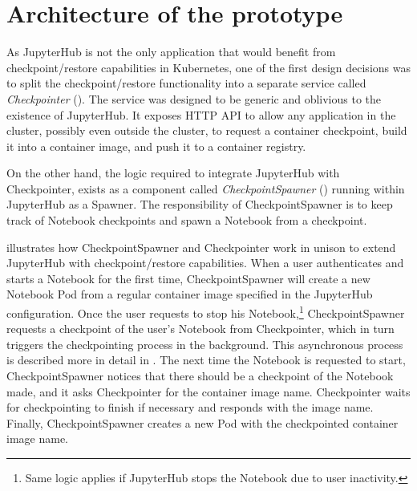 \documentclass[
  digital,     %
  oneside,     %
  nosansbold,  %
  nocolorbold, %
  lof,         %
  nolot,         %
]{fithesis4}
\begin{document}
\section{Architecture of the prototype}
As JupyterHub is not the only application that would benefit from checkpoint/restore capabilities in Kubernetes, one of the first design decisions was to split the checkpoint/restore functionality into a separate service called \emph{Checkpointer} (). The service was designed to be generic and oblivious to the existence of JupyterHub. It exposes HTTP API to allow any application in the cluster, possibly even outside the cluster, to request a container checkpoint, build it into a container image, and push it to a container registry.

On the other hand, the logic required to integrate JupyterHub with Checkpointer, exists as a component called \emph{CheckpointSpawner} () running within JupyterHub as a Spawner. The responsibility of CheckpointSpawner is to keep track of Notebook checkpoints and spawn a Notebook from a checkpoint.

 illustrates how CheckpointSpawner and Checkpointer work in unison to extend JupyterHub with checkpoint/restore capabilities. When a user authenticates and starts a Notebook for the first time, CheckpointSpawner will create a new Notebook Pod from a regular container image specified in the JupyterHub configuration. Once the user requests to stop his Notebook,\footnote{Same logic applies if JupyterHub stops the Notebook due to user inactivity.} CheckpointSpawner requests a checkpoint of the user's Notebook from Checkpointer, which in turn triggers the checkpointing process in the background. This asynchronous process is described more in detail in . The next time the Notebook is requested to start, CheckpointSpawner notices that there should be a checkpoint of the Notebook made, and it asks Checkpointer for the container image name. Checkpointer waits for checkpointing to finish if necessary and responds with the image name. Finally, CheckpointSpawner creates a new Pod with the checkpointed container image name.
\end{document}
